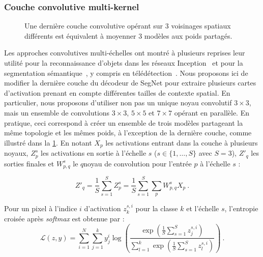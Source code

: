 \subsubsection{Couche convolutive multi-kernel}

\begin{figure}[t]
  \resizebox{\textwidth}{!}{}
  \caption{Une dernière couche convolutive opérant sur 3 voisinages spatiaux différents est équivalent à moyenner 3 modèles aux poids partagés.}
  \label{fig:contextual_module}
\end{figure}

Les approches convolutives multi-échelles ont montré à plusieurs reprises leur utilité pour la reconnaissance d'objets dans les réseaux Inception~\cite{szegedy_going_2015} et pour la segmentation sémantique~\cite{yu_multi-scale_2015}, y compris en télédétection~\cite{zhao_learning_2016}. Nous proposons ici de modifier la dernière couche du décodeur de SegNet pour extraire plusieurs cartes d'activation prenant en compte différentes tailles de contexte spatial. En particulier, nous proposons d'utiliser non pas un unique noyau convolutif $3\times3$, mais un ensemble de convolutions $3\times3$, $5\times5$ et $7\times7$ opérant en parallèle. En pratique, ceci correspond à créer un ensemble de trois modèles partageant la même topologie et les mêmes poids, à l'exception de la dernière couche, comme illustré dans la \cref{fig:contextual_module}. En notant $X_p$ les activations entrant dans la couche à plusieurs noyaux, $Z_p^s$ les activations en sortie à l'échelle $s$ ($s \in \{ 1, \dots, S \}$ avec $S = 3$), $Z'_q$ les sorties finales et $W_{p,q}^s$ le $q$\ieme noyau de convolution pour l'entrée $p$ à l'échelle $s$ :

\begin{equation}
Z'_q = \frac{1}{S} \sum_{s=1}^S Z_p^s = \frac{1}{S} \sum_{s=1}^S \sum_p W_{p,q}^s X_p~.
\end{equation}

Pour un pixel à l'indice $i$ d'activation $z_{k}^{s,i}$ pour la classe $k$ et l'échelle $s$, l'entropie croisée après \emph{softmax} est obtenue par :
\begin{equation}
\mathcal{L}(z,y) = \sum_{i=1}^N \sum_{j=1}^{k} y_j^i \log\left(\frac{\exp(\frac{1}{S} \sum\limits_{s=1}^S {z_{j}^{s,i}})}{\sum\limits_{l=1}^k \exp(\frac{1}{S} \sum\limits_{s=1}^S{z_{l}^{s,i}})}\right)~.
\end{equation}

